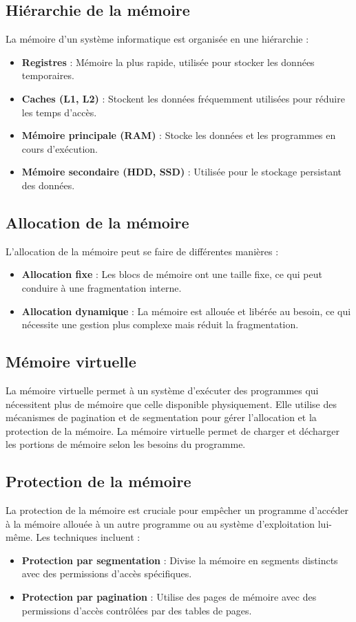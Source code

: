 \subsection{Hiérarchie de la mémoire}
La mémoire d'un système informatique est organisée en une hiérarchie :
\begin{itemize}
    \item \textbf{Registres} : Mémoire la plus rapide, utilisée pour stocker les données temporaires.
    \item \textbf{Caches (L1, L2)} : Stockent les données fréquemment utilisées pour réduire les temps d'accès.
    \item \textbf{Mémoire principale (RAM)} : Stocke les données et les programmes en cours d'exécution.
    \item \textbf{Mémoire secondaire (HDD, SSD)} : Utilisée pour le stockage persistant des données.
\end{itemize}

\subsection{Allocation de la mémoire}
L'allocation de la mémoire peut se faire de différentes manières :
\begin{itemize}
    \item \textbf{Allocation fixe} : Les blocs de mémoire ont une taille fixe, ce qui peut conduire à une fragmentation interne.
    \item \textbf{Allocation dynamique} : La mémoire est allouée et libérée au besoin, ce qui nécessite une gestion plus complexe mais réduit la fragmentation.
\end{itemize}

\subsection{Mémoire virtuelle}
La mémoire virtuelle permet à un système d'exécuter des programmes qui nécessitent plus de mémoire que celle disponible physiquement. 
Elle utilise des mécanismes de pagination et de segmentation pour gérer l'allocation et la protection de la mémoire. 
La mémoire virtuelle permet de charger et décharger les portions de mémoire selon les besoins du programme.

\subsection{Protection de la mémoire}
La protection de la mémoire est cruciale pour empêcher un programme d'accéder à la mémoire allouée à un autre programme ou au système d'exploitation lui-même. Les techniques incluent :
\begin{itemize}
    \item \textbf{Protection par segmentation} : Divise la mémoire en segments distincts avec des permissions d'accès spécifiques.
    \item \textbf{Protection par pagination} : Utilise des pages de mémoire avec des permissions d'accès contrôlées par des tables de pages.
\end{itemize}

